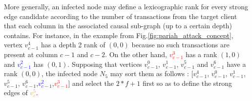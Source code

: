 More generally, an infected node may define a lexicographic rank for every strong edge candidate according to the number of transactions from the target client that each column in the associated causal sub-graph (up to a certain depth) contains.
For instance, in the example from Fig.\ref{fig:pariah_attack_concept}, vertex \textcolor{darkspringgreen}{$v^4_{c-1}$} has a depth 2 rank of $(0,0)$ because no such transactions are present at column $c-1$ and $c-2$.
On the other hand, \textcolor{red}{$v^3_{c-1}$} has a rank $(1,0)$ and \textcolor{blue}{$v^2_{c-1}$} has $(0,1)$.
Supposing that vertices $v^0_{c-1}$, $v^1_{c-1}$, $v^5_{c-1}$ and $v^6_{c-1}$ have a rank $(0,0)$, the infected node $N_5$ may sort them as follows : [\textcolor{darkspringgreen}{$v^4_{c-1}$}, $v^0_{c-1}$, $v^1_{c-1}$, $v^5_{c-1}$, $v^6_{c-1}$,\textcolor{blue}{$v^2_{c-1}$},\textcolor{red}{$v^3_{c-1}$}] and select the $2*f+1$ first so as to define the strong edges of \textcolor{orange}{$v^5_c$}.